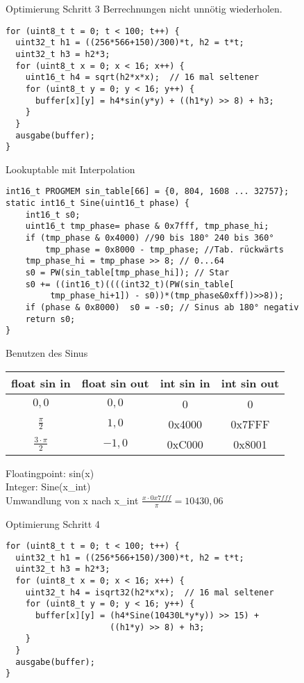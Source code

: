 \documentclass{beamer}
\begin{document}
\begin{frame}[fragile]{Optimierung Schritt 3}
Berrechnungen nicht unnötig wiederholen.
\begin{verbatim}
for (uint8_t t = 0; t < 100; t++) {
  uint32_t h1 = ((256*566+150)/300)*t, h2 = t*t; 
  uint32_t h3 = h2*3; 
  for (uint8_t x = 0; x < 16; x++) {
    uint16_t h4 = sqrt(h2*x*x);  // 16 mal seltener
    for (uint8_t y = 0; y < 16; y++) {
      buffer[x][y] = h4*sin(y*y) + ((h1*y) >> 8) + h3;
    }
  }
  ausgabe(buffer);
}
\end{verbatim}
\end{frame}

\begin{frame}[fragile]{Lookuptable mit Interpolation}
\begin{verbatim}
int16_t PROGMEM sin_table[66] = {0, 804, 1608 ... 32757};
static int16_t Sine(uint16_t phase) {
    int16_t s0;
    uint16_t tmp_phase= phase & 0x7fff, tmp_phase_hi;
    if (tmp_phase & 0x4000) //90 bis 180° 240 bis 360° 
        tmp_phase = 0x8000 - tmp_phase; //Tab. rückwärts
    tmp_phase_hi = tmp_phase >> 8; // 0...64
    s0 = PW(sin_table[tmp_phase_hi]); // Star
    s0 += ((int16_t)((((int32_t)(PW(sin_table[
         tmp_phase_hi+1]) - s0))*(tmp_phase&0xff))>>8));
    if (phase & 0x8000)  s0 = -s0; // Sinus ab 180° negativ
    return s0;
}
\end{verbatim}
\end{frame}

\begin{frame}[fragile]{Benutzen des Sinus}
\begin{tabular}[c] {cccc}
float sin in 	& float sin out  & int sin in & int sin out \\
\hline
$0,0$		& $0,0$	        & 0        & 0 \\
$\frac{\pi}{2}$&$1,0$	        & 0x4000   & 0x7FFF \\
$\frac{3\cdot\pi}{2}$&$-1,0$   & 0xC000   & 0x8001 \\
\end{tabular}
\newline
Floatingpoint: sin(x) \\
Integer: Sine(x\_int) \\
Umwandlung von x nach x\_int $ \frac{x \cdot 0x7fff}{\pi} = 10430,06 $ 
\end{frame}

\begin{frame}[fragile]{Optimierung Schritt 4}
\begin{verbatim}
for (uint8_t t = 0; t < 100; t++) {
  uint32_t h1 = ((256*566+150)/300)*t, h2 = t*t; 
  uint32_t h3 = h2*3; 
  for (uint8_t x = 0; x < 16; x++) {
    uint32_t h4 = isqrt32(h2*x*x);  // 16 mal seltener
    for (uint8_t y = 0; y < 16; y++) {
      buffer[x][y] = (h4*Sine(10430L*y*y)) >> 15) + 
                     ((h1*y) >> 8) + h3;
    }
  }
  ausgabe(buffer);
}
\end{verbatim}
\end{frame}
\end{document}
